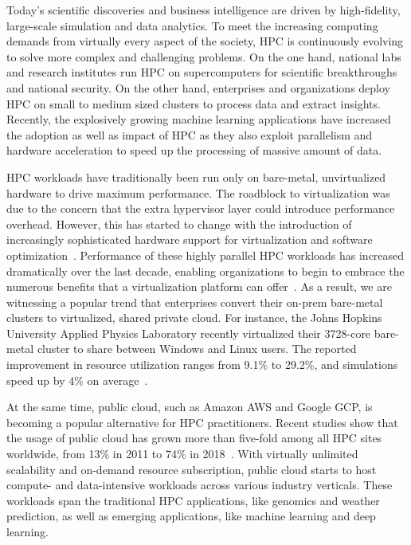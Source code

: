 Today's scientific discoveries and business intelligence are driven by high-fidelity, 
large-scale simulation and data analytics. To meet the increasing computing demands from 
virtually every aspect of the society, HPC is continuously evolving to solve more 
complex and challenging problems. On the one hand, national labs and research institutes run HPC on 
supercomputers for scientific breakthroughs and national security. On the other hand, enterprises and 
organizations deploy HPC on small to medium sized clusters to process data and extract insights. 
Recently, the explosively growing machine learning applications have increased the adoption as well as 
impact of HPC as they also exploit parallelism and hardware acceleration to speed up the processing of 
massive amount of data.


HPC workloads have traditionally been run only on bare-metal, unvirtualized hardware to drive maximum 
performance. 
The roadblock to virtualization was due to the concern that the extra hypervisor layer could introduce 
performance overhead. 
However, this has started to change with the introduction of increasingly sophisticated 
hardware support for virtualization and software optimization~\cite{madukkarumukumana2008resource,bugnion2017hardware}. Performance of 
these highly parallel HPC workloads has increased dramatically over the last decade, 
enabling organizations to begin to embrace the numerous benefits that a virtualization platform can 
offer~\cite{michael2018overcommit}. As a result, we are witnessing a popular trend that enterprises convert 
their on-prem bare-metal clusters to virtualized, shared private cloud. For instance, the Johns Hopkins 
University Applied Physics Laboratory recently virtualized their 3728-core bare-metal cluster 
to share between Windows and Linux users. The reported improvement in resource utilization 
ranges from 9.1\% to 29.2\%, and simulations speed up by 4\% on average~\cite{vmware2017josh}.

At the same time, public cloud, such as Amazon AWS and Google GCP, is becoming a popular alternative for 
HPC practitioners. Recent studies show that the usage of public cloud has grown more than five-fold among all HPC 
sites worldwide, from 13\% in 2011 to 74\% in 2018~\cite{hyperion2019}.
With virtually unlimited scalability and on-demand resource subscription, public cloud starts to host 
compute- and data-intensive workloads across various industry verticals. These workloads span the traditional HPC 
applications, like genomics and 
weather prediction, as well as emerging applications, like machine learning and deep learning. 

